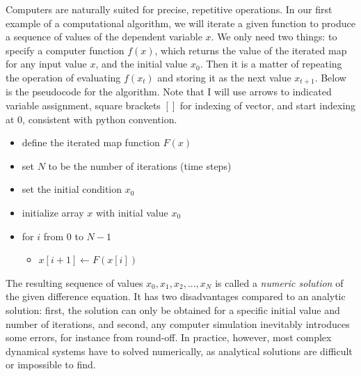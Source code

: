 \documentclass[
  letterpaper,
  DIV=11,
  numbers=noendperiod]{scrreprt}
\providecommand{\tightlist}{%
  \setlength{\itemsep}{0pt}\setlength{\parskip}{0pt}}\usepackage{longtable,booktabs,array}
\begin{document}
Computers are naturally suited for precise, repetitive operations. In
our first example of a computational algorithm, we will iterate a given
function to produce a sequence of values of the dependent variable
\(x\). We only need two things: to specify a computer function \(f(x)\),
which returns the value of the iterated map for any input value \(x\),
and the initial value \(x_0\). Then it is a matter of repeating the
operation of evaluating \(f(x_t)\) and storing it as the next value
\(x_{t+1}\). Below is the pseudocode for the algorithm. Note that I will
use arrows to indicated variable assignment, square brackets \([]\) for
indexing of vector, and start indexing at 0, consistent with python
convention.

\begin{tcolorbox}[enhanced jigsaw, colbacktitle=quarto-callout-tip-color!10!white, leftrule=.75mm, coltitle=black, left=2mm, breakable, opacityback=0, colback=white, toprule=.15mm, opacitybacktitle=0.6, bottomtitle=1mm, colframe=quarto-callout-tip-color-frame, rightrule=.15mm, bottomrule=.15mm, toptitle=1mm, titlerule=0mm, arc=.35mm, title={Iterative solution of difference equations:}]

\begin{itemize}
\tightlist
\item
  define the iterated map function \(F(x)\)
\item
  set \(N\) to be the number of iterations (time steps)
\item
  set the initial condition \(x_0\)
\item
  initialize array \(x\) with initial value \(x_0\)
\item
  for \(i\) from 0 to \(N-1\)

  \begin{itemize}
  \tightlist
  \item
    \(x[i+1] \gets F(x[i])\)
  \end{itemize}
\end{itemize}

\end{tcolorbox}

The resulting sequence of values \(x_0, x_1, x_2, ... , x_N\) is called
a \emph{numeric solution} of the given difference equation. It has two
disadvantages compared to an analytic solution: first, the solution can
only be obtained for a specific initial value and number of iterations,
and second, any computer simulation inevitably introduces some errors,
for instance from round-off. In practice, however, most complex
dynamical systems have to solved numerically, as analytical solutions
are difficult or impossible to find.
\end{document}
